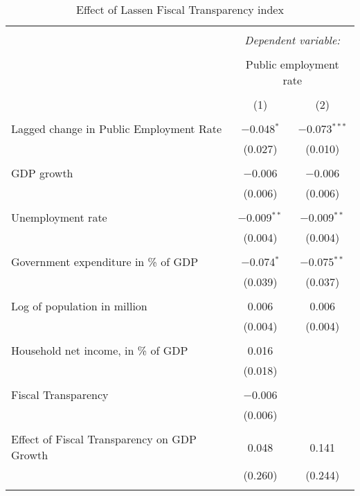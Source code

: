 
\begin{table}[!htbp] \centering 
  \caption{Effect of Lassen Fiscal Transparency index} 
  \label{} 
\begin{tabular}{@{\extracolsep{5pt}}lcc} 
\\[-1.8ex]\hline 
\hline \\[-1.8ex] 
 & \multicolumn{2}{c}{\textit{Dependent variable:}} \\ 
\cline{2-3} 
\\[-1.8ex] & \multicolumn{2}{c}{Public employment rate} \\ 
\\[-1.8ex] & (1) & (2)\\ 
\hline \\[-1.8ex] 
 Lagged change in Public Employment Rate & $-$0.048$^{*}$ & $-$0.073$^{***}$ \\ 
  & (0.027) & (0.010) \\ 
  & & \\ 
 GDP growth & $-$0.006 & $-$0.006 \\ 
  & (0.006) & (0.006) \\ 
  & & \\ 
 Unemployment rate & $-$0.009$^{**}$ & $-$0.009$^{**}$ \\ 
  & (0.004) & (0.004) \\ 
  & & \\ 
 Government expenditure in \% of GDP & $-$0.074$^{*}$ & $-$0.075$^{**}$ \\ 
  & (0.039) & (0.037) \\ 
  & & \\ 
 Log of population in million & 0.006 & 0.006 \\ 
  & (0.004) & (0.004) \\ 
  & & \\ 
 Household net income, in \% of GDP & 0.016 &  \\ 
  & (0.018) &  \\ 
  & & \\ 
 Fiscal Transparency & $-$0.006 &  \\ 
  & (0.006) &  \\ 
  & & \\ 
 Effect of Fiscal Transparency on GDP Growth & 0.048 & 0.141 \\ 
  & (0.260) & (0.244) \\ 
  & & \\ 

\end{tabular}
\end{table}
